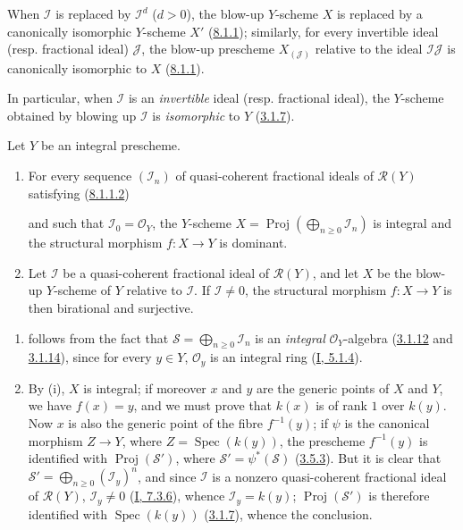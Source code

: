 When $\mathcal{I}$ is replaced by $\mathcal{I}^d$ ($d>0$), the blow-up
$Y$-scheme $X$ is replaced by a canonically isomorphic $Y$-scheme $X'$
(\hyperref[II.8.1.1]{8.1.1}); similarly, for every invertible ideal (resp.
fractional ideal) $\mathcal{J}$, the blow-up prescheme
$X_{(\mathcal{J})}$ relative to the ideal $\mathcal{I}\mathcal{J}$ is
canonically isomorphic to $X$ (\hyperref[II.8.1.1]{8.1.1}).

In particular, when $\mathcal{I}$ is an \emph{invertible} ideal (resp.
fractional ideal), the $Y$-scheme obtained by blowing up
$\mathcal{I}$ is \emph{isomorphic} to $Y$ (\hyperref[II.3.1.7]{3.1.7}).

\begin{proposition}[8.1.4]
\label{II.8.1.4}
Let $Y$ be an integral prescheme.
\begin{enumerate}
\item[\rm(i)] For every sequence $(\mathcal{I}_n)$ of quasi-coherent fractional
ideals of $\mathcal{R}(Y)$ satisfying
(\hyperref[II.8.1.1.2]{8.1.1.2})

and such that $\mathcal{I}_0=\mathcal{O}_Y$, the $Y$-scheme
$X=\operatorname{Proj}(\bigoplus_{n\geq0}\mathcal{I}_n)$ is integral and the
structural morphism $f:X\to Y$ is dominant.
\item[\rm(ii)] Let $\mathcal{I}$ be a quasi-coherent fractional ideal of
$\mathcal{R}(Y)$, and let $X$ be the blow-up $Y$-scheme of $Y$ relative to
$\mathcal{I}$. If $\mathcal{I}\neq0$, the structural morphism $f:X\to Y$ is
then birational and surjective.
\end{enumerate}
\end{proposition}

\begin{enumerate}
\item[\rm(i)] follows from the fact that $\mathcal{S}=\bigoplus_{n\geq0}\mathcal{I}_n$
is an \emph{integral} $\mathcal{O}_Y$-algebra
(\hyperref[II.3.1.12]{3.1.12} and \hyperref[II.3.1.14]{3.1.14}), since
for every $y\in Y$, $\mathcal{O}_y$ is an integral ring
(\hyperref[I.5.1.4]{I, 5.1.4}).
\item[\rm(ii)] By (i), $X$ is integral; if moreover $x$ and $y$ are the
generic points of $X$ and $Y$, we have $f(x)=y$, and we must prove that $k(x)$
is of rank $1$ over $k(y)$. Now $x$ is also the generic point of the fibre
$f^{-1}(y)$; if $\psi$ is the canonical morphism $Z\to Y$, where
$Z=\operatorname{Spec}(k(y))$, the prescheme $f^{-1}(y)$ is identified with
$\operatorname{Proj}(\mathcal{S}')$, where
$\mathcal{S}'=\psi^*(\mathcal{S})$ (\hyperref[II.3.5.3]{3.5.3}). But it is
clear that $\mathcal{S}'=\bigoplus_{n\geq0}(\mathcal{I}_y)^n$, and since
$\mathcal{I}$ is a nonzero quasi-coherent fractional ideal of
$\mathcal{R}(Y)$, $\mathcal{I}_y\neq0$
(\hyperref[I.7.3.6]{I, 7.3.6}), whence $\mathcal{I}_y=k(y)$;
$\operatorname{Proj}(\mathcal{S}')$ is therefore identified with
$\operatorname{Spec}(k(y))$ (\hyperref[II.3.1.7]{3.1.7}), whence the
conclusion.
\end{enumerate}

